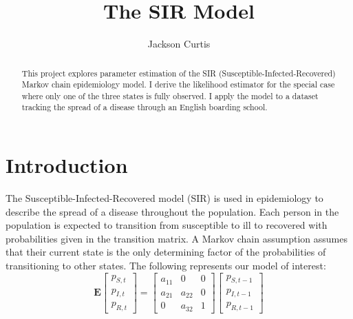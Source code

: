 \documentclass{svproc}
\begin{document}
\mainmatter              
\title{The SIR Model}


\author{Jackson Curtis}

\maketitle           

\begin{abstract}
This project explores parameter estimation of the SIR (Susceptible-Infected-Recovered) Markov chain epidemiology model. I derive the likelihood estimator for the special case where only one of the three states is fully observed. I apply the model to a dataset tracking the spread of a disease through an English boarding school. 
\end{abstract}

\section{Introduction}
The Susceptible-Infected-Recovered model (SIR) is used in epidemiology to describe the spread of a disease throughout the population. Each person in the population is expected to transition from susceptible to ill to recovered with probabilities given in the transition matrix. A Markov chain assumption assumes that their current state is the only determining factor of the probabilities of transitioning to other states. The following represents our model of interest:
\begin{equation}
\mathbf{E}\begin{bmatrix}
    p_{S,t}       \\
    p_{I,t}      \\

    p_{R,t}     
\end{bmatrix}
=
\begin{bmatrix}
a_{11} & 0 & 0 \\
a_{21} & a_{22} & 0 \\
0 & a_{32} & 1
\end{bmatrix}
\begin{bmatrix}
    p_{S,t-1}       \\
    p_{I,t-1}      \\

    p_{R,t-1}     
\end{bmatrix}
\label{e1}
\end{equation}
\end{document}
